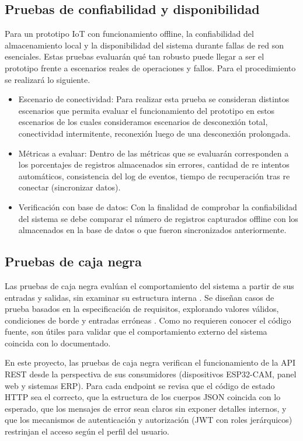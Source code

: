 \documentclass{iccmemoria}
\begin{document}
\subsection{Pruebas de confiabilidad y disponibilidad}
Para un prototipo IoT con funcionamiento offline, la confiabilidad del almacenamiento local y la disponibilidad del sistema durante fallas de red son esenciales. Estas pruebas evaluarán qué tan robusto puede llegar a ser el prototipo frente a escenarios reales de operaciones y fallos. Para el procedimiento se realizará lo siguiente.
\begin{itemize}
    \item Escenario de conectividad: Para realizar esta prueba se consideran distintos escenarios que permita evaluar el funcionamiento del prototipo en estos escenarios de los cuales consideramos escenarios de desconexión total, conectividad intermitente, reconexión luego de una desconexión prolongada.
    \item Métricas a evaluar: Dentro de las métricas que se evaluarán corresponden a los porcentajes de registros almacenados sin errores, cantidad de re intentos automáticos, consistencia del log de eventos, tiempo de recuperación tras re conectar (sincronizar datos).
    \item Verificación con base de datos: Con la finalidad de comprobar la confiabilidad del sistema se debe comparar el número de registros capturados offline con los almacenados en la base de datos o que fueron sincronizados anteriormente.
\end{itemize}

\subsection{Pruebas de caja negra}
Las pruebas de caja negra evalúan el comportamiento del sistema a partir de sus entradas y salidas, sin examinar su estructura interna \cite{pressman2015}. Se diseñan casos de prueba basados en la especificación de requisitos, explorando valores válidos, condiciones de borde y entradas erróneas \cite{myers2004}. Como no requieren conocer el código fuente, son útiles para validar que el comportamiento externo del sistema coincida con lo documentado.

En este proyecto, las pruebas de caja negra verifican el funcionamiento de la API REST desde la perspectiva de sus consumidores (dispositivos ESP32-CAM, panel web y sistemas ERP). Para cada endpoint se revisa que el código de estado HTTP sea el correcto, que la estructura de los cuerpos JSON coincida con lo esperado, que los mensajes de error sean claros sin exponer detalles internos, y que los mecanismos de autenticación y autorización (JWT con roles jerárquicos) restrinjan el acceso según el perfil del usuario.
\end{document}
